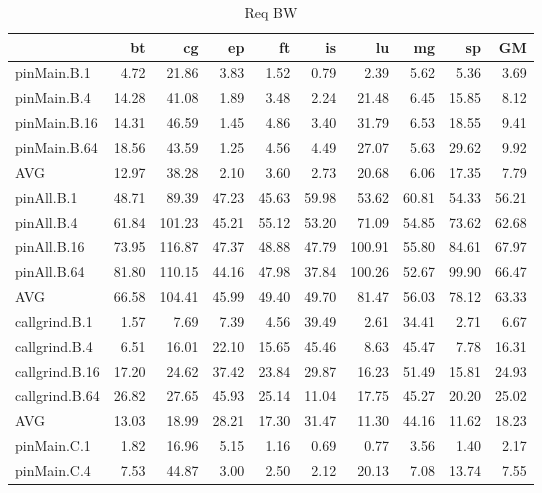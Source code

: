 \iffalse

\begin{table}[]
\caption{Req BW}
\label{comet_bw_pMpAcg_BC_itn_p3.5}\begin{center}
\begin{tabular}{lrrrrrrrrr}
\hline
                &    bt &     cg &    ep &    ft &    is &     lu &    mg &     sp &    GM \\
\hline
 pinMain.B.1    &  4.72 &  21.86 &  3.83 &  1.52 &  0.79 &   2.39 &  5.62 &   5.36 &  3.69 \\
 pinMain.B.4    & 14.28 &  41.08 &  1.89 &  3.48 &  2.24 &  21.48 &  6.45 &  15.85 &  8.12 \\
 pinMain.B.16   & 14.31 &  46.59 &  1.45 &  4.86 &  3.40 &  31.79 &  6.53 &  18.55 &  9.41 \\
 pinMain.B.64   & 18.56 &  43.59 &  1.25 &  4.56 &  4.49 &  27.07 &  5.63 &  29.62 &  9.92 \\
 AVG            & 12.97 &  38.28 &  2.10 &  3.60 &  2.73 &  20.68 &  6.06 &  17.35 &  7.79 \\
 pinAll.B.1     & 48.71 &  89.39 & 47.23 & 45.63 & 59.98 &  53.62 & 60.81 &  54.33 & 56.21 \\
 pinAll.B.4     & 61.84 & 101.23 & 45.21 & 55.12 & 53.20 &  71.09 & 54.85 &  73.62 & 62.68 \\
 pinAll.B.16    & 73.95 & 116.87 & 47.37 & 48.88 & 47.79 & 100.91 & 55.80 &  84.61 & 67.97 \\
 pinAll.B.64    & 81.80 & 110.15 & 44.16 & 47.98 & 37.84 & 100.26 & 52.67 &  99.90 & 66.47 \\
 AVG            & 66.58 & 104.41 & 45.99 & 49.40 & 49.70 &  81.47 & 56.03 &  78.12 & 63.33 \\
 callgrind.B.1  &  1.57 &   7.69 &  7.39 &  4.56 & 39.49 &   2.61 & 34.41 &   2.71 &  6.67 \\
 callgrind.B.4  &  6.51 &  16.01 & 22.10 & 15.65 & 45.46 &   8.63 & 45.47 &   7.78 & 16.31 \\
 callgrind.B.16 & 17.20 &  24.62 & 37.42 & 23.84 & 29.87 &  16.23 & 51.49 &  15.81 & 24.93 \\
 callgrind.B.64 & 26.82 &  27.65 & 45.93 & 25.14 & 11.04 &  17.75 & 45.27 &  20.20 & 25.02 \\
 AVG            & 13.03 &  18.99 & 28.21 & 17.30 & 31.47 &  11.30 & 44.16 &  11.62 & 18.23 \\
 pinMain.C.1    &  1.82 &  16.96 &  5.15 &  1.16 &  0.69 &   0.77 &  3.56 &   1.40 &  2.17 \\
 pinMain.C.4    &  7.53 &  44.87 &  3.00 &  2.50 &  2.12 &  20.13 &  7.08 &  13.74 &  7.55 \\

\end{tabular}
\end{center}
\end{table}
